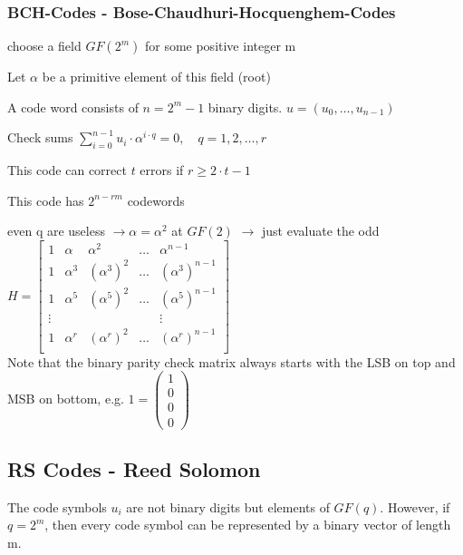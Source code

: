 \subsubsection{BCH-Codes - Bose-Chaudhuri-Hocquenghem-Codes}
\begin{liste}
  \item choose a field $GF(2^m)$ for some positive integer m
  \item Let $\alpha$ be a primitive element of this field (root)
  \item A code word consists of $n=2^m-1$ binary digits. $u=(u_0, \ldots, u_{n-1})$
  \item Check sums $\displaystyle\sum_{i=0}^{n-1} u_i \cdot \alpha^{i \cdot q} = 0, \quad q=1,2,\ldots,r$
  \item This code can correct $t$ errors if $r \geq 2\cdot t-1$
  \item This code has $2^{n-rm}$ codewords
  \item even q are useless $\to \alpha=\alpha^2$ at $GF(2)$ $\to$ just evaluate the odd\\
     			$H=\begin{bmatrix} 	1 & \alpha   & \alpha^2     	& \ldots	& \alpha^{n-1} \\    		
   						   		1 & \alpha^3 & (\alpha^3)^2	& \ldots	& (\alpha^3)^{n-1}  \\    
   						   		1 & \alpha^5 & (\alpha^5)^2	& \ldots	& (\alpha^5)^{n-1}  \\   
   						   		\vdots	&	 &					&			& \vdots \\   						 
   						   		1 & \alpha^r & (\alpha^r)^2	& \ldots	& (\alpha^r)^{n-1}  \\   		
   			\end{bmatrix}$\\
			Note that the binary parity check matrix always starts with the LSB on top and MSB on bottom, e.g. $1=\begin{pmatrix} 1 \\ 0 \\ 0 \\ 0 \end{pmatrix}$ \\
\end{liste}

\subsection{RS Codes - Reed Solomon}
The code symbols $u_i$ are not binary digits but elements of $GF(q)$. However, if $q=2^m$, then every code symbol
can be represented by a binary vector of length m.\\


